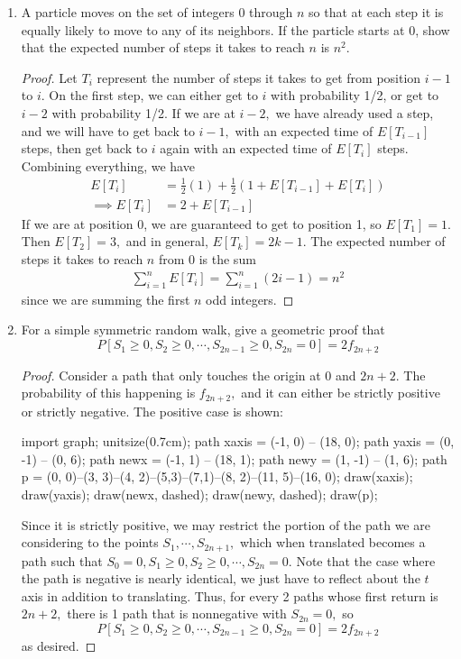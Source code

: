 \documentclass{article}
\begin{document}
\begin{enumerate}
	\item A particle moves on the set of integers 0 through $n$ so that at each step it is equally likely to move to any of its neighbors. If the particle starts at 0, show that the expected number of steps it takes to reach $n$ is $n^2.$
		\begin{proof}
			Let $T_i$ represent the number of steps it takes to get from position $i-1$ to $i.$ On the first step, we can either get to $i$ with probability 1/2, or get to $i-2$ with probability 1/2. If we are at $i-2,$ we have already used a step, and we will have to get back to $i-1,$ with an expected time of $E[T_{i-1}]$ steps, then get back to $i$ again with an expected time of $E[T_i]$ steps. Combining everything, we have
			\begin{align*}
				E[T_i] &= \frac{1}{2}(1) + \frac{1}{2}\left( 1+E[T_{i-1}] + E[T_i] \right) \\
				\implies E[T_i] &= 2 + E[T_{i-1}]
			\end{align*}
			If we are at position 0, we are guaranteed to get to position 1, so $E[T_1]=1.$ Then $E[T_2]=3,$ and in general, $E[T_k] = 2k-1.$ The expected number of steps it takes to reach $n$ from 0 is the sum
			\begin{align*}
				\sum_{i=1}^{n}E[T_i] = \sum_{i=1}^{n} (2i-1) = n^2
			\end{align*}
			since we are summing the first $n$ odd integers.
		\end{proof}

	\item For a simple symmetric random walk, give a geometric proof that 
		\[P[S_1\ge 0, S_2\ge 0, \cdots, S_{2n-1}\ge 0, S_{2n}=0] = 2f_{2n+2}\]
		\begin{proof}
			Consider a path that only touches the origin at 0 and $2n+2.$ The probability of this happening is $f_{2n+2},$ and it can either be strictly positive or strictly negative. The positive case is shown:
			\begin{center}
				\begin{asy}
					import graph;
					unitsize(0.7cm);
					path xaxis = (-1, 0) -- (18, 0);
					path yaxis = (0, -1) -- (0, 6);
					path newx = (-1, 1) -- (18, 1);
					path newy = (1, -1) -- (1, 6);
					path p = (0, 0)--(3, 3)--(4, 2)--(5,3)--(7,1)--(8, 2)--(11, 5)--(16, 0);
					draw(xaxis);
					draw(yaxis);
					draw(newx, dashed);
					draw(newy, dashed);
					draw(p);
				\end{asy}
			\end{center}
			Since it is strictly positive, we may restrict the portion of the path we are considering to the points $S_1, \cdots, S_{2n+1},$ which when translated becomes a path such that $S_0= 0, S_1\ge 0, S_2\ge 0, \cdots, S_{2n}=0.$ Note that the case where the path is negative is nearly identical, we just have to reflect about the $t$ axis in addition to translating. Thus, for every 2 paths whose first return is $2n+2,$ there is 1 path that is nonnegative with $S_{2n}=0,$ so 
			\[P[S_1\ge 0, S_2\ge 0, \cdots, S_{2n-1}\ge 0, S_{2n}=0] = 2f_{2n+2}\]
			as desired.
		\end{proof}


\end{enumerate}
\end{document}
